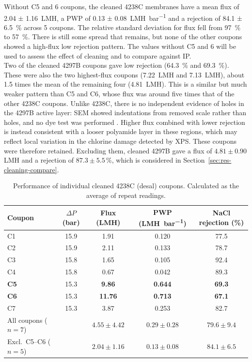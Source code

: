   Without C5 and 6 coupons, the cleaned 4238C membranes have a mean flux of 2.04 $\pm$ \qty{1.16}{LMH}, a PWP of 0.13 $\pm$ \qty{0.08}{LMH.bar^{-1}} and a rejection of 84.1 $\pm$ \qty{6.5}{\percent} across 5 coupons. The relative standard deviation for flux fell from \qty{97}{\percent} to \qty{57}{\percent}. There is still some spread that remains, but none of the other coupons showed a high-flux low rejection pattern. The values without C5 and 6 will be used to assess the effect of cleaning and to compare against IP.\\

  \flag{}
  Two of the cleaned 4297B coupons gave low rejection (\qty{64.3}{\percent} and \qty{69.3}{\percent}). These were also the two highest-flux coupons (\qty{7.22}{LMH} and \qty{7.13}{LMH}), about 1.5 times the mean of the remaining four (\qty{4.81}{LMH}). This is a similar but much weaker pattern than C5 and C6, whose flux was around five times that of the other 4238C coupons. Unlike 4238C, there is no independent evidence of holes in the 4297B active layer: SEM showed indentations from removed scale rather than holes, and no dye test was performed \citep{MembraneWorks2026Mine}. Higher flux combined with lower rejection is instead consistent with a looser polyamide layer in these regions, which may reflect local variation in the chlorine damage detected by XPS. These coupons were therefore retained. Excluding them, cleaned 4297B gave a flux of $4.81 \pm 0.90$\,\unit{LMH} and a rejection of $87.3 \pm 5.5$\,\unit{\percent}, which is considered in Section~\ref{sec:res-cleaning-compare}.



\begin{table}[htbp]
  \centering
  \caption{Performance of individual cleaned 4238C (desal) coupons.
  Calculated as the average of repeat readings.}
  \label{tab:clean-desal-coupons}
  \begin{tabular}{lcccc}
    \toprule
    Coupon & $\Delta P$ (\unit{bar}) & Flux (\unit{LMH}) & PWP (\unit{LMH.bar^{-1}}) & NaCl rejection (\%) \\
    \midrule
    C1 & 15.9 & 1.91 & 0.120 & 77.5 \\
    C2 & 15.9 & 2.11 & 0.133 & 78.7 \\
    C3 & 15.8 & 1.65 & 0.105 & 92.4 \\
    C4 & 15.8 & 0.67 & 0.042 & 89.3 \\
    \textbf{C5} & 15.3 & \textbf{9.86} & \textbf{0.644} & \textbf{69.3} \\
    \textbf{C6} & 15.3 & \textbf{11.76} & \textbf{0.713} & \textbf{67.1} \\
    C7 & 15.3 & 3.87 & 0.253 & 82.7 \\
    \midrule
    All coupons ($n = 7$)     & & $4.55 \pm 4.42$ & $0.29 \pm 0.28$ & $79.6 \pm 9.4$ \\
    Excl.\ C5--C6 ($n = 5$)   & & $2.04 \pm 1.16$ & $0.13 \pm 0.08$ & $84.1 \pm 6.5$ \\
    \bottomrule
  \end{tabular}
\end{table}

